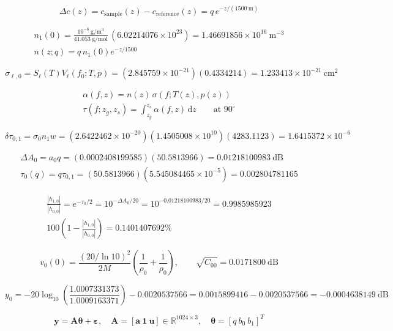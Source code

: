 \documentclass{article}
\begin{document}
\color{eqcolor}\fontsize{27}{36}\selectfont
\[\displaystyle \Delta c(z)=c_{\mathrm{sample}}(z)-c_{\mathrm{reference}}(z)=q\,e^{-z/(1500\ \mathrm m)}\]

\newpage
\[\displaystyle \begin{gathered}n_1(0)=\frac{10^{-6}\ \mathrm{g/m^3}}{41.053\ \mathrm{g/mol}}\,(6.02214076\times10^{23})=1.46691856\times10^{16}\ \mathrm{m^{-3}}\\n(z;q)=q\,n_1(0)e^{-z/1500}\end{gathered}\]

\newpage
\[\displaystyle \sigma_{\ell,0}=S_\ell(T)V_\ell(f_0;T,p)=(2.845759\times10^{-21})(0.4334214)=1.233413\times10^{-21}\ \mathrm{cm^2}\]

\newpage
\[\displaystyle \begin{gathered}\alpha(f,z)=n(z)\,\sigma\!\left(f;T(z),p(z)\right)\\\tau(f;z_g,z_s)=\int_{z_g}^{z_s}\alpha(f,z)\,\mathrm dz\qquad\text{at }90^\circ\end{gathered}\]

\newpage
\[\displaystyle \delta\tau_{0,1}=\sigma_0n_1w=(2.6422462\times10^{-20})(1.4505008\times10^{10})(4283.1123)=1.6415372\times10^{-6}\]

\newpage
\[\displaystyle \begin{gathered}\Delta A_0=a_0q=(0.0002408199585)(50.5813966)=0.01218100983\ \mathrm{dB}\\\tau_0(q)=q\tau_{0,1}=(50.5813966)(5.545084465\times10^{-5})=0.002804781165\end{gathered}\]

\newpage
\[\displaystyle \begin{gathered}\frac{|h_{1,0}|}{|h_{0,0}|}=e^{-\tau_0/2}=10^{-\Delta A_0/20}=10^{-0.01218100983/20}=0.9985985923\\100\left(1-\frac{|h_{1,0}|}{|h_{0,0}|}\right)=0.1401407692\%\end{gathered}\]

\newpage
\[\displaystyle v_0(0)=\frac{(20/\ln10)^2}{2M}\left(\frac1{\rho_0}+\frac1{\rho_0}\right),\qquad\sqrt{C_{00}}=0.0171800\ \mathrm{dB}\]

\newpage
\[\displaystyle y_0=-20\log_{10}\!\left(\frac{1.0007331373}{1.0009163371}\right)-0.0020537566=0.0015899416-0.0020537566=-0.0004638149\ \mathrm{dB}\]

\newpage
\[\displaystyle \mathbf y=\mathbf A\boldsymbol\theta+\boldsymbol\varepsilon,\quad\mathbf A=[\mathbf a\ \mathbf1\ \mathbf u]\in\mathbb R^{1024\times3},\quad\boldsymbol\theta=[q\ b_0\ b_1]^T\]
\end{document}
